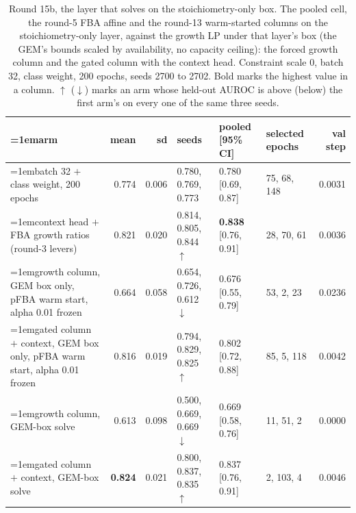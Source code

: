 \begin{table}[H]
  \centering
  \scriptsize
  \setlength{\tabcolsep}{2.5pt}
  \caption[Round 15b, the layer that solves on the stoichiometry-only box]{Round 15b, the layer that solves on the stoichiometry-only box. The pooled cell, the round-5 FBA affine and the round-13 warm-started columns on the stoichiometry-only layer, against the growth LP under that layer's box (the GEM's bounds scaled by availability, no capacity ceiling): the forced growth column and the gated column with the context head. Constraint scale 0, batch 32, class weight, 200 epochs, seeds 2700 to 2702. Bold marks the highest value in a column. $\uparrow$ ($\downarrow$) marks an arm whose held-out AUROC is above (below) the first arm's on every one of the same three seeds.}
  \label{tab:w29}
  \begin{tabular}{@{}>{\raggedright\hangindent=1em\hangafter=1\arraybackslash}p{81.1mm}rrlllr@{}}
    \hline
    arm & mean & sd & seeds & pooled [95\% CI] & selected epochs & val step \\
    \hline
    batch 32 $+$ class weight, 200 epochs & 0.774 & 0.006 & 0.780, 0.769, 0.773 & 0.780 [0.69, 0.87] & 75, 68, 148 & 0.0031 \\
    context head $+$ FBA growth ratios (round-3 levers) & 0.821 & 0.020 & 0.814, 0.805, 0.844 $\uparrow$ & \textbf{0.838} [0.76, 0.91] & 28, 70, 61 & 0.0036 \\
    growth column, GEM box only, pFBA warm start, alpha 0.01 frozen & 0.664 & 0.058 & 0.654, 0.726, 0.612 $\downarrow$ & 0.676 [0.55, 0.79] & 53, 2, 23 & 0.0236 \\
    gated column $+$ context, GEM box only, pFBA warm start, alpha 0.01 frozen & 0.816 & 0.019 & 0.794, 0.829, 0.825 $\uparrow$ & 0.802 [0.72, 0.88] & 85, 5, 118 & 0.0042 \\
    growth column, GEM-box solve & 0.613 & 0.098 & 0.500, 0.669, 0.669 $\downarrow$ & 0.669 [0.58, 0.76] & 11, 51, 2 & 0.0000 \\
    gated column $+$ context, GEM-box solve & \textbf{0.824} & 0.021 & 0.800, 0.837, 0.835 $\uparrow$ & 0.837 [0.76, 0.91] & 2, 103, 4 & 0.0046 \\
    \hline
  \end{tabular}
\end{table}
